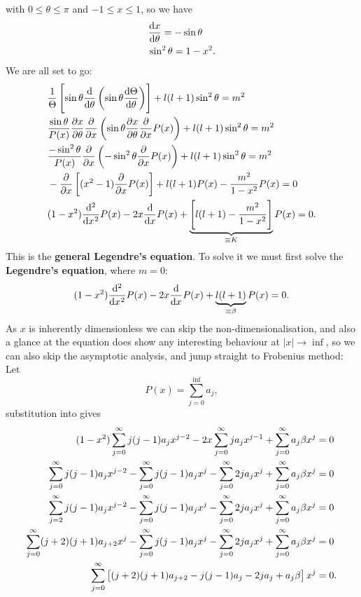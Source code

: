 with $0\leq\theta\leq\pi$ and $-1\leq x\leq1$, so we have
\begin{subequations}
\begin{align}
&\diff{x}{\theta}=-\sin\theta\\
&\sin^2\theta=1-x^2.
\end{align}
\end{subequations}
We are all set to go:
\begin{subequations}
\begin{align}
&\frac{1}{\Theta}\lf[\sin\theta\diff{}{\theta}\lf(\sin\theta\diff{\Theta}{\theta} \rt) \rt]+l(l+1)\sin^2\theta=m^2\\
&\frac{\sin\theta}{P(x)}\diffp x\theta\diffp{}{x}\lf(\sin\theta\diffp x\theta\diffp{}{x}P(x) \rt)+l(l+1)\sin^2\theta=m^2\\
&\frac{-\sin^2\theta}{P(x)}\diffp{}{x}\lf(-\sin^2\theta\diffp{}{x}P(x) \rt)+l(l+1)\sin^2\theta=m^2\\
&-\diffp{}{x}\lf[(x^2-1)\diffp{}{x}P(x) \rt]+l(l+1)P(x)-\frac{m^2}{1-x^2}P(x)=0\\
&(1-x^2)\diff*[2]{P(x)}x-2x\diff{}{x}P(x)+\underbrace{\lf[l(l+1)-\frac{m^2}{1-x^2} \rt]}_{\equiv K}P(x)=0. \label{ass_lgdeq}
\end{align}
\end{subequations}
This is the \textbf{general Legendre's equation}. To solve it we must first solve the 
\textbf{Legendre's equation}, where $m=0$: 
\begin{equation}
\label{lgdeq}
(1-x^2)\diff*[2]{P(x)}x-2x\diff{}{x}P(x)+\underbrace{l(l+1)}_{\equiv \beta}P(x)=0.
\end{equation}
As $x$ is inherently dimensionless we can skip the non-dimensionalisation, and also 
a glance at the equation does show any interesting behaviour at $|x|\rightarrow\inf$, 
so we can also skip the asymptotic analysis, and jump straight to Frobenius method: \\
Let 
\begin{equation}
P(x)=\sum_{j=0}^{\inf}a_j,
\end{equation}
substitution into  gives
\begin{subequations}
\begin{align}
(1-x^2)\sum^{\infty}_{j=0} j(j-1)a_jx^{j-2}-2x \sum^{\infty}_{j=0} ja_jx^{j-1}+\sum^{\infty}_{j=0}a_j\beta x^j&=0\\
\sum^{\infty}_{j=0} j(j-1)a_jx^{j-2}- \sum^{\infty}_{j=0} j(j-1)a_jx^j- \sum^{\infty}_{j=0} 2ja_jx^j+\sum^{\infty}_{j=0} a_j\beta x^j&=0\\
\sum^{\infty}_{j=2} j(j-1)a_jx^{j-2}- \sum^{\infty}_{j=0} j(j-1)a_jx^j- \sum^{\infty}_{j=0} 2ja_jx^j+\sum^{\infty}_{j=0} a_j\beta x^j&=0\\
\sum^{\infty}_{j=0} (j+2)(j+1)a_{j+2}x^{j}- \sum^{\infty}_{j=0} j(j-1)a_jx^j- \sum^{\infty}_{j=0} 2ja_jx^j+\sum^{\infty}_{j=0} a_j\beta x^j&=0\\
\sum^{\infty}_{j=0}\left[ (j+2)(j+1)a_{j+2}-  j(j-1)a_j-  2ja_j+ a_j\beta\right] x^j&=0.
\end{align}
\end{subequations}

